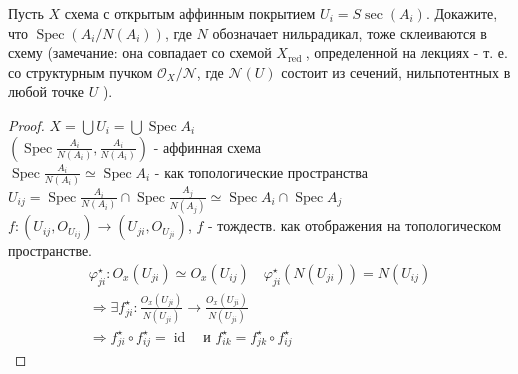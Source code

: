 \begin{prob}
Пусть $X$ схема с открытым аффинным покрытием $U_i=S \sec \left(A_i\right)$. Докажите, что $\operatorname{Spec}\left(A_i / N\left(A_i\right)\right)$, где $N$ обозначает нильрадикал, тоже склеиваются в схему (замечание: она совпадает со схемой $X_{\text {red }}$, определенной на лекциях - т. е. со структурным пучком $\mathcal{O}_X / \mathcal{N}$, где $\mathcal{N}(U)$ состоит из сечений, нильпотентных в любой точке $U$ ).
\end{prob}
\begin{proof}
$X = \bigcup U_i = \bigcup \operatorname{Spec} A_i$\\
$(\operatorname{Spec} \frac{A_i}{N(A_i)}, \frac{A_i}{N(A_i)})$ - аффинная схема\\
$\operatorname{Spec} \frac{A_i}{N(A_i)} \simeq \operatorname{Spec} A_i$ - как топологические пространства\\
$U_{ij} = \operatorname{Spec} \frac{A_i}{N(A_i)} \cap \operatorname{Spec} \frac{A_j}{N(A_j)} \simeq \operatorname{Spec} A_i \cap \operatorname{Spec} A_j$\\
$f: (U_{ij}, O_{U_{ij}}) \to (U_{ji}, O_{U_{ji}})$, $f$ - тождеств. как отображения на топологическом пространстве.
\begin{gather*}
	\varphi_{ji}^{\star}: O_x(U_{ji}) \simeq O_x(U_{ij})\quad
	\varphi_{ji}^{\star}(N(U_{ji})) = N(U_{ij})\\
	\Rightarrow \exists f_{ji}^{\star}: \frac{O_x(U_{ji})}{N(U_{ji})} \to \frac{O_x(U_{ji})}{N(U_{ji})}\\
	\Rightarrow f_{ji}^{\star} \circ f_{ij}^{\star} = \operatorname{id}\quad \text{и }
	f_{ik}^{\star} = f_{jk}^{\star} \circ f_{ij}^{\star}
\end{gather*}
\end{proof}
\begin{comment}

\end{comment}
\newpage




